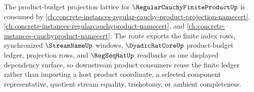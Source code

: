 The product-budget projection lattice for $\RegularCauchyFiniteProductUp$ is consumed by \autoref{ch:concrete-instances-regular-cauchy-product-projection-namecert}, \autoref{ch:concrete-instances-regularcauchyproduct-namecert}, and \autoref{ch:concrete-instances-cauchyproduct-namecert}. The route exports the finite index rows, synchronized $\StreamNameUp$ windows, $\DyadicRatCoreUp$ product-budget ledger, projection rows, and $\RegSeqRatUp$ readbacks as one displayed dependency surface, so downstream product consumers reuse the finite ledger rather than importing a host product coordinate, a selected component representative, quotient stream equality, trichotomy, or ambient completeness.
